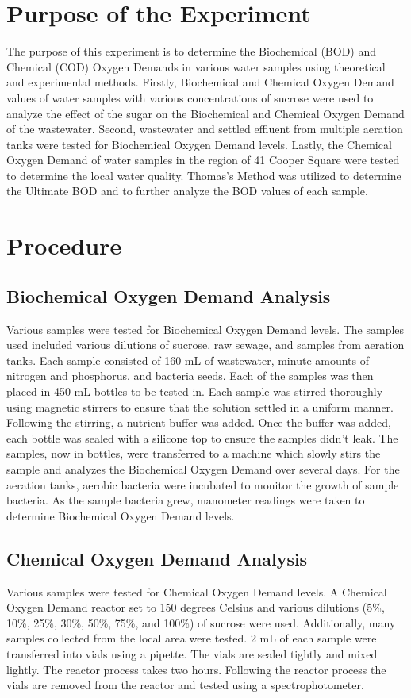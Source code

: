 \documentclass{article}
\begin{document}
    
    \tableofcontents
    \newpage
    \listoftables
    \listoffigures
    \newpage
    \section{Purpose of the Experiment}
    \indent The purpose of this experiment is to determine the Biochemical (BOD) and Chemical (COD) Oxygen Demands in various water samples using theoretical and experimental methods. Firstly, Biochemical and Chemical Oxygen Demand values of water samples with various concentrations of sucrose were used to analyze the effect of the sugar on the Biochemical and Chemical Oxygen Demand of the wastewater. Second, wastewater and settled effluent from multiple aeration tanks were tested for Biochemical Oxygen Demand levels. Lastly, the Chemical Oxygen Demand of water samples in the region of 41 Cooper Square were tested to determine the local water quality. Thomas's Method was utilized to determine the Ultimate BOD and to further analyze the BOD values of each sample.
    \newpage
    \section{Procedure}
    \subsection{Biochemical Oxygen Demand Analysis}
    \indent Various samples were tested for Biochemical Oxygen Demand levels. The samples used included various dilutions of sucrose, raw sewage, and samples from aeration tanks. Each sample consisted of 160 mL of wastewater, minute amounts of nitrogen and phosphorus, and bacteria seeds. Each of the samples was then placed in 450 mL bottles to be tested in. Each sample was stirred thoroughly using magnetic stirrers to ensure that the solution settled in a uniform manner. Following the stirring, a nutrient buffer was added. Once the buffer was added, each bottle was sealed with a silicone top to ensure the samples didn't leak. The samples, now in bottles, were transferred to a machine which slowly stirs the sample and analyzes the Biochemical Oxygen Demand over several days. For the aeration tanks, aerobic bacteria were incubated to monitor the growth of sample bacteria. As the sample bacteria grew, manometer readings were taken to determine Biochemical Oxygen Demand levels. 
    \subsection{Chemical Oxygen Demand Analysis}
    \indent Various samples were tested for Chemical Oxygen Demand levels. A Chemical Oxygen Demand reactor set to 150 degrees Celsius and various dilutions (5\%, 10\%, 25\%, 30\%, 50\%, 75\%, and 100\%) of sucrose were used. Additionally, many samples collected from the local area were tested. 2 mL of each sample were transferred into vials using a pipette. The vials are sealed tightly and mixed lightly. The reactor process takes two hours. Following the reactor process the vials are removed from the reactor and tested using a spectrophotometer. 
    \newpage
\end{document}
